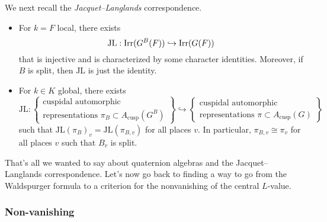 \documentclass[reqno]{amsart} 
\numberwithin{theorem}{section}
\numberwithin{equation}{section}
\numberwithin{exercise}{section}
\begin{document}
We next recall the \emph{Jacquet--Langlands} correspondence.
\begin{itemize}
\item For $k = F$ local, there exists
  \begin{equation*}
    \mathrm{JL} : \operatorname{Irr}(G^B(F)) \hookrightarrow \operatorname{Irr}(G(F))
  \end{equation*}
  that is injective and is characterized by some character identities.  Moreover, if $B$ is split, then $\mathrm{JL}$ is just the identity.
\item For $k \in K$ global, there exists
  \begin{equation*}
    \mathrm{JL} :
    \left\{
      \begin{array}{c}
        \text{cuspidal automorphic } \\
        \text{representations } \pi_B \subset A_{\mathrm{cusp}}(G^B)
      \end{array}
    \right\}
    \hookrightarrow 
    \left\{
      \begin{array}{c}
        \text{cuspidal automorphic } \\
        \text{representations } \pi \subset A_{\mathrm{cusp}}(G)
      \end{array}
    \right\}
  \end{equation*}
  such that $\mathrm{JL}(\pi_B)_v = \mathrm{JL}(\pi_{B, v})$ for all places $v$.  In particular, $\pi_{B, v} \cong \pi_v$ for all places $v$ such that $B_v$ is split.
\end{itemize}

That's all we wanted to say about quaternion algebras and the Jacquet--Langlands correspondence.  Let's now go back to finding a way to go from the Waldspurger formula to a criterion for the nonvanishing of the central $L$-value.

\subsubsection{Non-vanishing}
\end{document}
